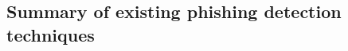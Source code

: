 
\begin{landscape}
  \thispagestyle{mylandscape}
  \subsection*{Summary of existing phishing detection techniques}
\end{landscape}
